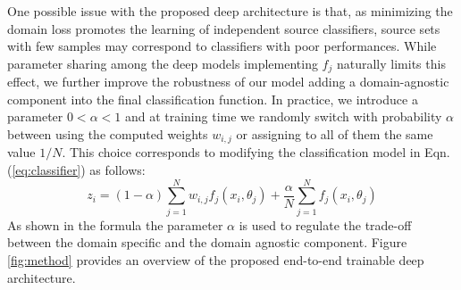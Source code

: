 \documentclass{article}
\begin{document}
One possible issue with the proposed deep architecture is that, as minimizing the domain loss promotes the learning of independent source classifiers, source sets with few samples may correspond to classifiers with poor performances. While parameter sharing among the deep models implementing $f_j$ naturally limits this effect, we further improve the robustness of our model adding a domain-agnostic component into the final classification function. In practice, we introduce a parameter $0<\alpha<1$ and at training time we randomly switch with probability $\alpha$ between using the computed weights $w_{i,j}$ or assigning to all of them the same value $1/N$. This choice corresponds to modifying the classification model in Eqn.(\ref{eq:classifier}) as follows:
\vspace{-0.1cm}
 \begin{equation}
 \label{eq:final-classifier}
 z_i=(1-\alpha) \sum_{j=1}^{N} w_{i,j} f_{j}(x_i,\theta_j) + \frac{\alpha}{N}\sum_{j=1}^{N} f_{j}(x_i,\theta_j)
 \end{equation}
As shown in the formula the parameter $\alpha$ is used to regulate the trade-off between the domain specific and the domain agnostic component. Figure \ref{fig:method} provides an overview of the proposed end-to-end trainable deep architecture.

















 

 

 
\end{document}
